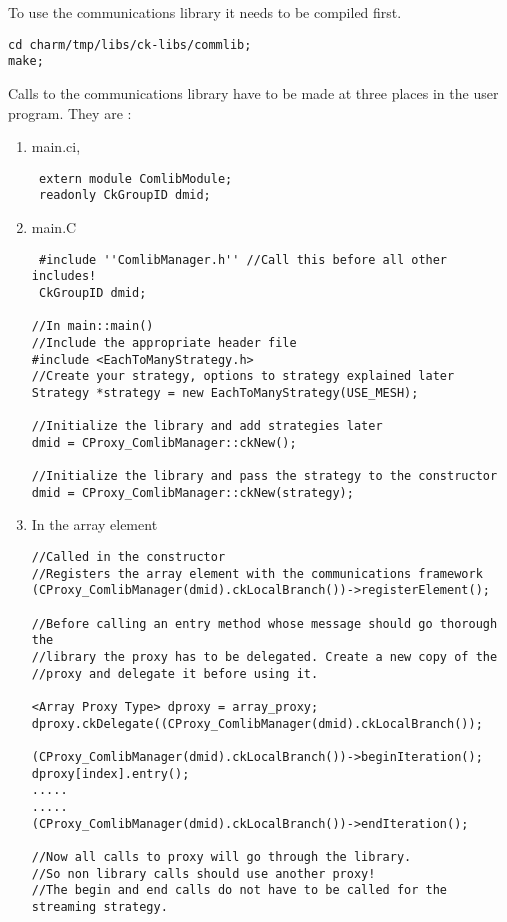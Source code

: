 To use the communications library it needs to be compiled first.

\begin{verbatim}
cd charm/tmp/libs/ck-libs/commlib;
make;
\end{verbatim}

Calls to the communications library have to be made at three places in
the user program. They are :

\begin{enumerate}

\item main.ci, \\
\begin{verbatim}
 extern module ComlibModule; 
 readonly CkGroupID dmid; 
\end{verbatim}

\item main.C \\
\begin{verbatim}
 #include ''ComlibManager.h'' //Call this before all other includes!
 CkGroupID dmid; 

//In main::main() 
//Include the appropriate header file
#include <EachToManyStrategy.h>
//Create your strategy, options to strategy explained later
Strategy *strategy = new EachToManyStrategy(USE_MESH);

//Initialize the library and add strategies later
dmid = CProxy_ComlibManager::ckNew(); 

//Initialize the library and pass the strategy to the constructor
dmid = CProxy_ComlibManager::ckNew(strategy); 

\end{verbatim}

\item In the array element \\
\begin{verbatim}
//Called in the constructor
//Registers the array element with the communications framework
(CProxy_ComlibManager(dmid).ckLocalBranch())->registerElement();

//Before calling an entry method whose message should go thorough the
//library the proxy has to be delegated. Create a new copy of the
//proxy and delegate it before using it.

<Array Proxy Type> dproxy = array_proxy;
dproxy.ckDelegate((CProxy_ComlibManager(dmid).ckLocalBranch());

(CProxy_ComlibManager(dmid).ckLocalBranch())->beginIteration();
dproxy[index].entry();
.....
.....
(CProxy_ComlibManager(dmid).ckLocalBranch())->endIteration();

//Now all calls to proxy will go through the library.
//So non library calls should use another proxy!
//The begin and end calls do not have to be called for the streaming strategy.
\end{verbatim}
\end{enumerate}

